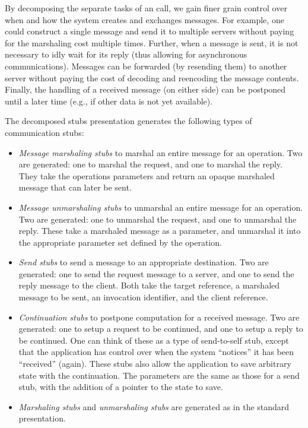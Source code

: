 By decomposing the separate tasks of an \RPC{} call, we gain finer grain
control over when and how the system creates and exchanges messages.  For
example, one could construct a single message and send it to multiple servers
without paying for the marshaling cost multiple times.  Further, when a message
is sent, it is not necessary to idly wait for its reply (thus allowing for
asynchronous communications).  Messages can be forwarded (by resending them) to
another server without paying the cost of decoding and reencoding the message
contents.  Finally, the handling of a received message (on either side) can be
postponed until a later time (e.g., if other data is not yet available).

The decomposed stubs presentation generates the following types of
communication stubs:

\begin{itemize}
  \item \emph{Message marshaling stubs} to marshal an entire message for an
  operation.  Two are generated: one to marshal the request, and one to marshal
  the reply.  They take the operations parameters and return an opaque
  marshaled message that can later be sent.

  \item \emph{Message unmarshaling stubs} to unmarshal an entire message for an
  operation.  Two are generated: one to unmarshal the request, and one to
  unmarshal the reply.  These take a marshaled message as a parameter, and
  unmarshal it into the appropriate parameter set defined by the operation.

  \item \emph{Send stubs} to send a message to an appropriate destination.  Two
  are generated: one to send the request message to a server, and one to send
  the reply message to the client.  Both take the target reference, a marshaled
  message to be sent, an invocation identifier, and the client reference.

  \item \emph{Continuation stubs} to postpone computation for a received
  message.  Two are generated: one to setup a request to be continued, and one
  to setup a reply to be continued.  One can think of these as a type of
  send-to-self stub, except that the application has control over when the
  system ``notices'' it has been ``received'' (again).  These stubs also allow
  the application to save arbitrary state with the continuation.  The
  parameters are the same as those for a send stub, with the addition of a
   pointer to the state to save.

  \item \emph{Marshaling stubs} and \emph{unmarshaling stubs} are generated as
  in the standard presentation.
\end{itemize}

